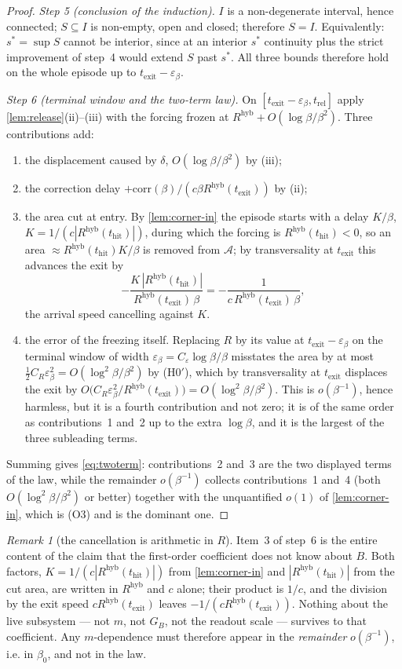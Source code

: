 \documentclass[11pt]{article}
\theoremstyle{definition}
\theoremstyle{remark}
\newtheorem{remark}{Remark}
\newcommand{\hyb}{\mathrm{hyb}}
\newcommand{\thit}{t_{\mathrm{hit}}}
\newcommand{\texit}{t_{\mathrm{exit}}}
\newcommand{\trel}{t_{\mathrm{rel}}}
\newcommand{\Ar}{\mathcal{A}}
\begin{document}
\begin{proof}
\emph{Step 5 (conclusion of the induction).} $I$ is a non-degenerate interval,
hence connected; $S\subseteq I$ is non-empty, open and closed; therefore $S=I$.
Equivalently: $s^\ast=\sup S$ cannot be interior, since at an interior $s^\ast$
continuity plus the strict improvement of step~4 would extend $S$ past $s^\ast$.
All three bounds therefore hold on the whole episode up to
$\texit-\varepsilon_\beta$.

\emph{Step 6 (terminal window and the two-term law).} On
$[\texit-\varepsilon_\beta,\trel]$ apply \cref{lem:release}(ii)--(iii) with the
forcing frozen at $R^{\hyb}+O(\log\beta/\beta^2)$. Three contributions add:
\begin{enumerate}
\item the displacement caused by $\delta$, $O(\log\beta/\beta^2)$ by (iii);
\item the correction delay $+\mathrm{corr}(\beta)/(c\beta R^{\hyb}(\texit))$ by
(ii);
\item the area cut at entry. By \cref{lem:corner-in} the episode starts with a
delay $K/\beta$, $K=1/(c|R^{\hyb}(\thit)|)$, during which the forcing is
$R^{\hyb}(\thit)<0$, so an area $\approx R^{\hyb}(\thit)K/\beta$ is removed from
$\Ar$; by transversality at $\texit$ this advances the exit by
\[
-\frac{K\,|R^{\hyb}(\thit)|}{R^{\hyb}(\texit)\,\beta}
=-\frac{1}{c\,R^{\hyb}(\texit)\,\beta},
\]
the arrival speed cancelling against $K$.
\item the error of the freezing itself. Replacing $R$ by its value at
$\texit-\varepsilon_\beta$ on the terminal window of width
$\varepsilon_\beta=C_\varepsilon\log\beta/\beta$ misstates the area by at most
$\tfrac12C_R\varepsilon_\beta^2=O(\log^2\beta/\beta^2)$ by (H0$'$), which by
transversality at $\texit$ displaces the exit by
$O\bigl(C_R\varepsilon_\beta^2/R^{\hyb}(\texit)\bigr)=O(\log^2\beta/\beta^2)$.
This is $o(\beta^{-1})$, hence harmless, but it is a fourth contribution and not
zero; it is of the same order as contributions~1 and~2 up to the extra
$\log\beta$, and it is the largest of the three subleading terms.
\end{enumerate}
Summing gives \eqref{eq:twoterm}: contributions~2 and~3 are the two displayed
terms of the law, while the remainder $o(\beta^{-1})$ collects contributions~1
and~4 (both $O(\log^2\beta/\beta^2)$ or better) together with
the unquantified $o(1)$ of \cref{lem:corner-in}, which is (O3) and is the
dominant one.
\end{proof}

\begin{remark}[the cancellation is arithmetic in $R$]\label{rem:cancel}
Item~3 of step~6 is the entire content of the claim that the first-order
coefficient does not know about $B$. Both factors, $K=1/(c|R^{\hyb}(\thit)|)$
from \cref{lem:corner-in} and $|R^{\hyb}(\thit)|$ from the cut area, are written
in $R^{\hyb}$ and $c$ alone; their product is $1/c$, and the division by the exit
speed $cR^{\hyb}(\texit)$ leaves $-1/(cR^{\hyb}(\texit))$. Nothing about the live
subsystem --- not $m$, not $G_B$, not the readout scale --- survives to that
coefficient. Any $m$-dependence must therefore appear in the
\emph{remainder} $o(\beta^{-1})$, i.e. in $\beta_0$, and not in the law.
\end{remark}
\end{document}
